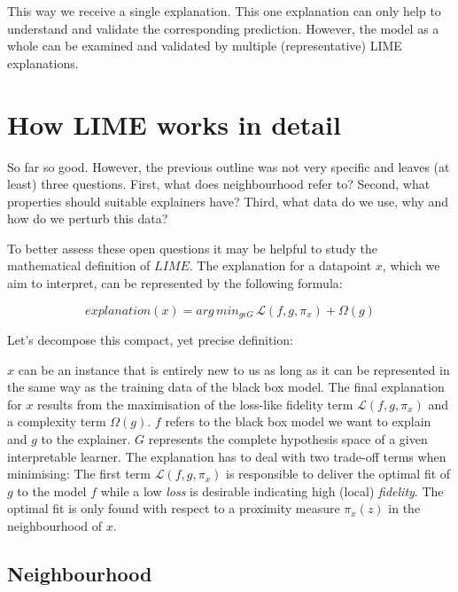 \documentclass[
]{krantz}
\begin{document}
This way we receive a single explanation.
This one explanation can only help to understand and validate the corresponding prediction.
However, the model as a whole can be examined and validated by multiple (representative) LIME explanations.

\hypertarget{how-lime-works-in-detail}{%
\section{How LIME works in detail}\label{how-lime-works-in-detail}}

So far so good.
However, the previous outline was not very specific and leaves (at least) three questions.
First, what does neighbourhood refer to?
Second, what properties should suitable explainers have?
Third, what data do we use, why and how do we perturb this data?

To better assess these open questions it may be helpful to study the mathematical definition of \(LIME\).
The explanation for a datapoint \(x\), which we aim to interpret, can be represented by the following formula:

\[explanation\left(x\right) = arg\,min_{g \epsilon G} \,\mathcal{L}\left(f, g, \pi_x \right) + \Omega\left(g\right)\]

Let's decompose this compact, yet precise definition:

\(x\) can be an instance that is entirely new to us as long as it can be represented in the same way as the training data of the black box model.
The final explanation for \(x\) results from the maximisation of the loss-like fidelity term \(\mathcal{L}\left(f, g, \pi_x \right)\) and a complexity term \(\Omega\left(g\right)\).
\(f\) refers to the black box model we want to explain and \(g\) to the explainer.
\(G\) represents the complete hypothesis space of a given interpretable learner.
The explanation has to deal with two trade-off terms when minimising:
The first term \(\mathcal{L}\left(f, g, \pi_x \right)\) is responsible to deliver the optimal fit of \(g\) to the model \(f\) while a low \emph{loss} is desirable indicating high (local) \emph{fidelity}.
The optimal fit is only found with respect to a proximity measure \(\pi_x(z)\) in the neighbourhood of \(x\).

\hypertarget{neighbourhood}{%
\subsection{Neighbourhood}\label{neighbourhood}}
\end{document}
